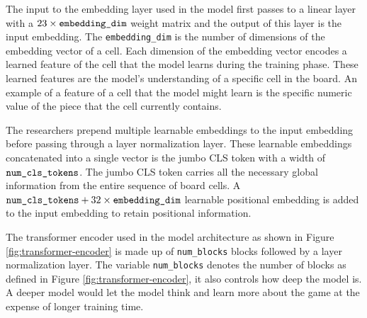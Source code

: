 

The input to the embedding layer used in the model first passes to a linear layer with a $23 \times \verb|embedding_dim|$ weight matrix and the output of this layer is the input embedding. The \verb|embedding_dim| is the number of dimensions of the embedding vector of a cell. Each dimension of the embedding vector encodes a learned feature of the cell that the model learns during the training phase. These learned features are the model's understanding of a specific cell in the board. An example of a feature of a cell that the model might learn is the specific numeric value of the piece that the cell currently contains.


The researchers prepend multiple learnable embeddings to the input embedding before passing through a layer normalization layer. These learnable embeddings concatenated into a single vector is the jumbo CLS token with a width of $\verb|num_cls_tokens|$. The jumbo CLS token carries all the necessary global information from the entire sequence of board cells. A $\verb|num_cls_tokens| + 32 \times \verb|embedding_dim|$ learnable positional embedding is added to the input embedding to retain positional information.

The transformer encoder used in the model architecture as shown in Figure \ref{fig:transformer-encoder} is made up of \verb|num_blocks| blocks followed by a layer normalization layer. The variable \verb|num_blocks| denotes the number of blocks as defined in Figure \ref{fig:transformer-encoder}, it also controls how deep the model is. A deeper model would let the model think and learn more about the game at the expense of longer training time.

